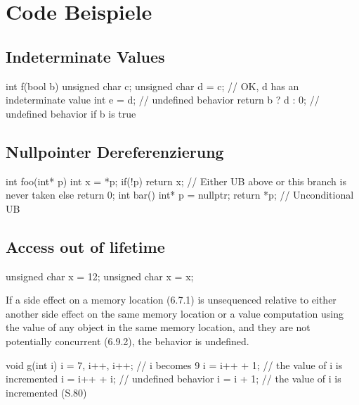 \section{Code Beispiele}
\label{sec:codebsp}

\subsection{Indeterminate Values}
\label{subsec:indeterminate}

int f(bool b) {
        unsigned char c;
        unsigned char d = c; // OK, d has an indeterminate value
        int e = d; // undefined behavior
        return b ? d : 0; // undefined behavior if b is true
    }
\cite[S.63 f.]{book:cpp-standard}

\subsection{Nullpointer Dereferenzierung}
\label{subsec:nullpointer}

int foo(int* p) {
        int x = *p;
        if(!p) return x; // Either UB above or this branch is never taken
        else return 0;
    }
int bar() {
        int* p = nullptr;
        return *p;        // Unconditional UB
    }
\cite{misc:cpp-undefined}

\subsection{Access out of lifetime}
\label{subsec:outside-lifetime}

unsigned char x = 12;
{ unsigned char x = x; }
\cite[S.35]{book:cpp-standard}

If a side effect on a memory location (6.7.1) is unsequenced relative to either another
side effect on the same memory location or a value computation using the value of any object in the same
memory location, and they are not potentially concurrent (6.9.2), the behavior is undefined.

void g(int i) {
        i = 7, i++, i++; // i becomes 9
        i = i++ + 1; // the value of i is incremented
        i = i++ + i; // undefined behavior
        i = i + 1; // the value of i is incremented
    }
(S.80)